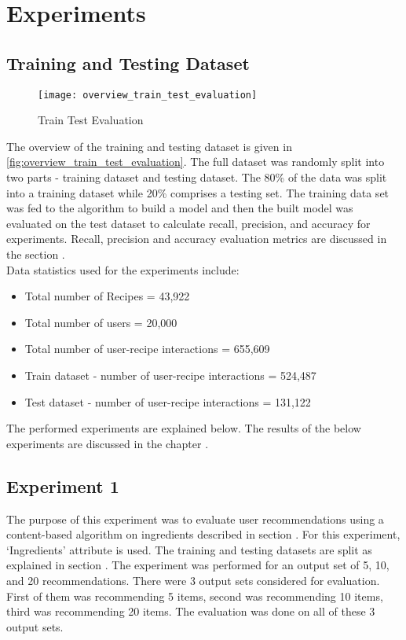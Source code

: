 \section{Experiments}

\subsection{Training and Testing Dataset}
\label{sec:traintest}
\begin{singlespace}
\begin{figure}[H]
	\centering
	\texttt{[image: overview\_train\_test\_evaluation]}
	\caption{Train Test Evaluation }
	\label{fig:overview_train_test_evaluation}
\end{figure}  
\end{singlespace}
The overview of the training and testing dataset is given in \autoref{fig:overview_train_test_evaluation}. The full dataset was randomly split into
two parts - training dataset and testing dataset. The 80\% of the data was split into a training dataset while 20\% comprises a testing set.
The training data set was fed to the algorithm to build a model and then the built model was evaluated on the test dataset to calculate recall, precision, and accuracy for experiments. Recall, precision and accuracy evaluation metrics are discussed in the section . \\
Data statistics used for the experiments include:
\begin{itemize}
\item Total number of Recipes = 43,922
\item Total number of users = 20,000
\item Total number of user-recipe interactions = 655,609
\item Train dataset - number of user-recipe interactions = 524,487
\item Test dataset - number of user-recipe interactions = 131,122
\end{itemize}
\noindent
The performed experiments are explained below. The results of the below experiments are discussed in the chapter .
\subsection{Experiment 1}
\label{sec:cb_ingred_exp}
The purpose of this experiment was to evaluate user recommendations using a content-based algorithm on ingredients described in section . For this experiment, \lq{}Ingredients\rq{} attribute is used. The training and testing datasets are split as explained in section . The experiment was performed for an output set of 5, 10, and 20 recommendations. There were 3 output sets considered for evaluation. First of them was recommending 5 items, second was recommending 10 items, third was recommending 20 items. The evaluation was done on all of these 3 output sets.

